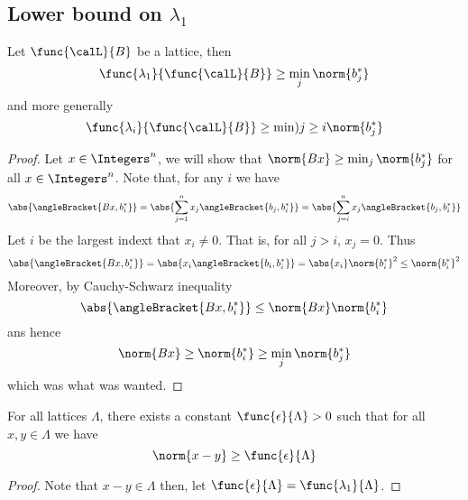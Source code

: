 \subsection{Lower bound on \(\lambda_1\)}
\begin{theorem}
    Let \(\func{\calL}{B}\) be a lattice, then
    \begin{equation*}
        \func{\lambda_1}{\func{\calL}{B}} \geq \min_j \norm{b_j^{\ast}}
    \end{equation*}
    and more generally 
    \begin{equation*}
        \func{\lambda_i}{\func{\calL}{B}} \geq \min){j \geq i} \norm{b_j^{\ast}}
    \end{equation*}
\end{theorem}
\begin{proof}
    Let \(x \in \Integers^n\), we will show that \(\norm{Bx} \geq \min_j \norm{b_j^{\ast}}\) for all \(x \in \Integers^n\). Note that, for any \(i\) we have
    \begin{equation*}
        \abs{\angleBracket{Bx, b_i^{\ast}}} = \abs{\sum_{j = 1}^n x_j\angleBracket{b_j , b_i^{\ast}}} = \abs{\sum_{j = i}^n x_j\angleBracket{b_j , b_i^{\ast}}} 
    \end{equation*}
    Let \(i\) be the largest indext that \(x_i \neq 0\). That is, for all \(j > i\), \(x_j = 0\). Thus 
    \begin{equation*}
        \abs{\angleBracket{Bx, b_i^{\ast}}} = \abs{x_i\angleBracket{b_i , b_i^{\ast}}} = \abs{x_i} \norm{b_i^{\ast}}^2 \leq \norm{b_i^{\ast}}^2
    \end{equation*}
    Moreover, by Cauchy-Schwarz inequality 
    \begin{equation*}
        \abs{\angleBracket{Bx, b_i^{\ast}}} \leq \norm{Bx} \norm{b_i^{\ast}}
    \end{equation*}
    ans hence 
    \begin{equation*}
        \norm{Bx} \geq \norm{b_i^{\ast}} \geq \min_j \norm{b_j^{\ast}}
    \end{equation*}
    which was what was wanted.
\end{proof}

\begin{corollary}
    For all lattices \(\Lambda\), there exists a constant \(\func{\epsilon}{\Lambda} > 0\) such that for all \(x,y \in \Lambda\) we have 
    \begin{equation*}
        \norm{x - y} \geq \func{\epsilon}{\Lambda}
    \end{equation*}
\end{corollary}
\begin{proof}
    Note that \(x -y \in \Lambda\) then, let \(\func{\epsilon}{\Lambda} = \func{\lambda_1}{\Lambda}\).
\end{proof}

